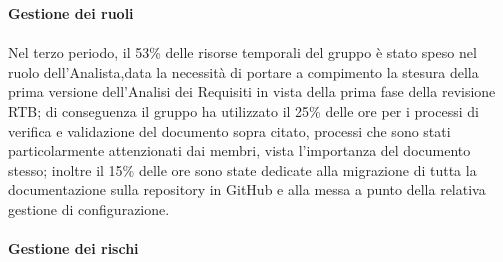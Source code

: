 \textbf{Gestione dei ruoli}

\paragraph{}
Nel terzo periodo, il 53\% delle risorse temporali del gruppo è stato speso nel ruolo dell'Analista,data la necessità 
di portare a compimento la stesura della prima versione dell'Analisi dei Requisiti in vista della prima fase della revisione
RTB; di conseguenza il gruppo ha utilizzato il 25\% delle ore per i processi di verifica e validazione del documento sopra citato, processi che
sono stati particolarmente attenzionati dai membri, vista l'importanza del documento stesso; inoltre il 15\% delle ore sono state dedicate alla
migrazione di tutta la documentazione sulla repository in GitHub e alla messa a punto della relativa gestione di configurazione.

\pagebreak

\paragraph{Gestione dei rischi}

